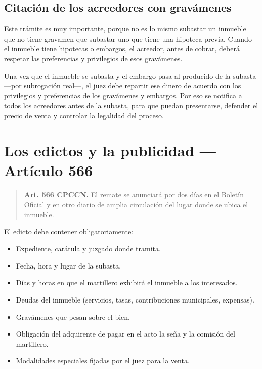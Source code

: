 \documentclass[12pt,oneside]{book}
\begin{document}
\subsection{Citación de los acreedores con gravámenes}

Este trámite es muy importante, porque no es lo mismo subastar un inmueble que no tiene gravamen que subastar uno que tiene una hipoteca previa. Cuando el inmueble tiene hipotecas o embargos, el acreedor, antes de cobrar, deberá respetar las preferencias y privilegios de esos gravámenes.

Una vez que el inmueble se subasta y el embargo pasa al producido de la subasta ---por subrogación real---, el juez debe repartir ese dinero de acuerdo con los privilegios y preferencias de los gravámenes y embargos. Por eso se notifica a todos los acreedores antes de la subasta, para que puedan presentarse, defender el precio de venta y controlar la legalidad del proceso.

\section{Los edictos y la publicidad --- Artículo 566}

\begin{quote}
\textbf{Art. 566 CPCCN.} El remate se anunciará por dos días en el Boletín Oficial y en otro diario de amplia circulación del lugar donde se ubica el inmueble.
\end{quote}

El edicto debe contener obligatoriamente:

\begin{itemize}
    \item Expediente, carátula y juzgado donde tramita.
    \item Fecha, hora y lugar de la subasta.
    \item Días y horas en que el martillero exhibirá el inmueble a los interesados.
    \item Deudas del inmueble (servicios, tasas, contribuciones municipales, expensas).
    \item Gravámenes que pesan sobre el bien.
    \item Obligación del adquirente de pagar en el acto la seña y la comisión del martillero.
    \item Modalidades especiales fijadas por el juez para la venta.
\end{itemize}
\end{document}

